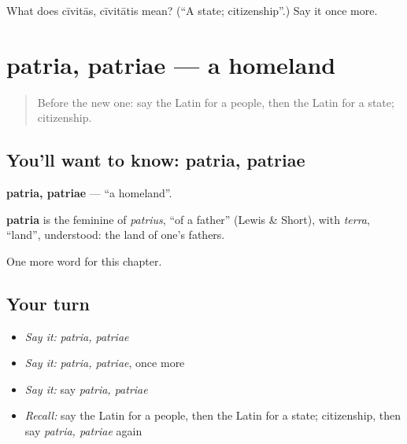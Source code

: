\begin{tcolorbox}[breakable,colback=teal!4,colframe=teal!35!black,title={Before you move on}]
What does cīvitās, cīvitātis mean? (\textquotedblleft{}A state; citizenship\textquotedblright{}.) Say it once more.
\end{tcolorbox}
\section[patria, patriae]{patria, patriae — a homeland}

\label{lesson:LA-C271-patria}



\begin{quote}
Before the new one: say the Latin for a people, then the Latin for a state; citizenship.
\end{quote}

\subsection*{You'll want to know: patria, patriae}
\textbf{patria, patriae} — \textquotedblleft{}a homeland\textquotedblright{}.

\begin{cousinweb}
\textbf{patria} is the feminine of \emph{patrius}, \textquotedblleft{}of a father\textquotedblright{} (Lewis \& Short), with \emph{terra}, \textquotedblleft{}land\textquotedblright{}, understood: the land of one's fathers.
\end{cousinweb}

\begin{grammarlens}[title={What you've built}]
One more word for this chapter.
\end{grammarlens}

\subsection*{Your turn}
\begin{itemize}
\raggedright
  \item \emph{Say it:} \emph{patria, patriae}
  \item \emph{Say it:} \emph{patria, patriae}, once more
  \item \emph{Say it:} say \emph{patria, patriae}
  \item \emph{Recall:} say the Latin for a people, then the Latin for a state; citizenship, then say \emph{patria, patriae} again
\end{itemize}

